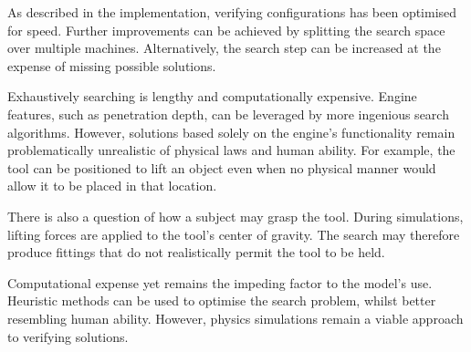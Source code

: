 \documentclass[11]{article}
\begin{document}
As described in the implementation, verifying configurations has been optimised for speed.
Further improvements can be achieved by splitting the search space over multiple machines.
Alternatively, the search step can be increased at the expense of missing possible solutions. 

Exhaustively searching is lengthy and computationally expensive.
Engine features, such as penetration depth, can be leveraged by more ingenious search algorithms.
However, solutions based solely on the engine's functionality remain problematically unrealistic of physical laws and human ability.
For example, the tool can be positioned to lift an object even when no physical manner would allow it to be placed in that location.  

There is also a question of how a subject may grasp the tool.
During simulations, lifting forces are applied to the tool's center of gravity.
The search may therefore produce fittings that do not realistically permit the tool to be held.

Computational expense yet remains the impeding factor to the model's use. 
Heuristic methods can be used to optimise the search problem, whilst better resembling human ability.
However, physics simulations remain a viable approach to verifying solutions. 

\printbibliography
\end{document}
